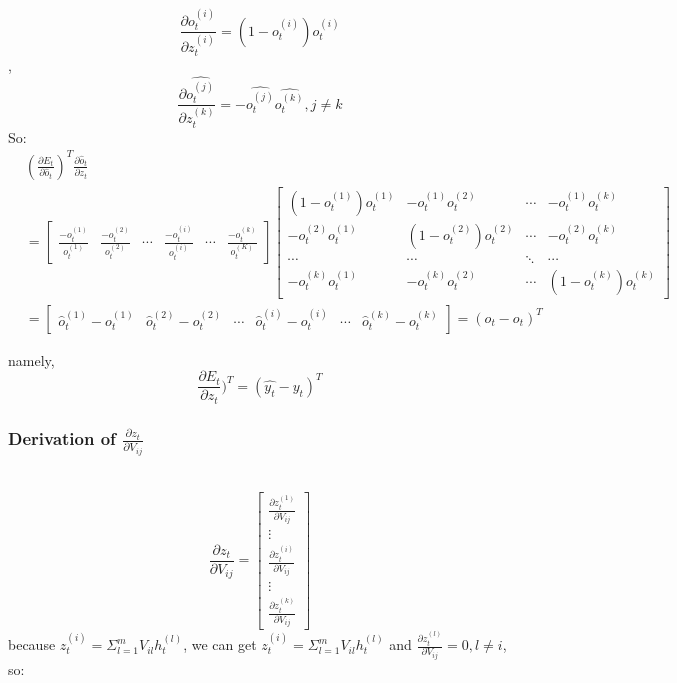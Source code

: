 \documentclass[oneside,solution]{seu-ml-assign}
\begin{document}
\begin{equation}\frac{\partial o_t^{(i)}}{\partial z_t^{(i)}}=(1-o_t^{(i)})o_t^{(i)}\end{equation},
\begin{equation}\frac{\partial\hat{o_t^{(j)}}}{\partial z_t^{(k)}}=-\hat{o_t^{(j)}}\hat{o_t^{(k)}},j\neq k\end{equation}
So:
\begin{equation}
  \begin{aligned}
     & \left(\frac{\partial E_{t}}{\partial \hat{o}_{t}}\right)^{T} \frac{\partial \hat{o}_{t}}{\partial z_{t}}                                      \\
     & = \begin{bmatrix}
           \frac{-o_t^{(1)}}{o_t^{(1)}} & \frac{-o_t^{(2)}}{o_t^{(2)}} & \cdots & \frac{-o_t^{(i)}}{o_t^{(i)}} & \cdots & \frac{-o_t^{(k)}}{o_t^{(K)}}
         \end{bmatrix}
    \begin{bmatrix}
      (1-o_t^{(1)})o_t^{(1)} & -o_t^{(1)}o_t^{(2)}    & \cdots & -o_t^{(1)}o_t^{(k)}    \\
      -o_t^{(2)}o_t^{(1)}    & (1-o_t^{(2)})o_t^{(2)} & \cdots & -o_t^{(2)}o_t^{(k)}    \\
      \cdots                 & \cdots                 & \ddots & \cdots                 \\
      -o_t^{(k)}o_t^{(1)}    & -o_t^{(k)}o_t^{(2)}    & \cdots & (1-o_t^{(k)})o_t^{(k)}
    \end{bmatrix}                                                                \\
     & = \begin{bmatrix}
           \hat{o}_t^{(1)} - o_t^{(1)} & \hat{o}_t^{(2)} - o_t^{(2)} & \cdots & \hat{o}_t^{(i)} - o_t^{(i)} & \cdots & \hat{o}_t^{(k)} - o_t^{(k)}
         \end{bmatrix} = (\hat{o}_t - o_t)^T
  \end{aligned}
\end{equation}


namely, \begin{equation}\frac{\partial E_{t}}{\partial z_{t}})^{T}=(\hat{y_{t}}-y_{t})^{T}\end{equation}


\subsubsection{Derivation of $\frac{\partial z_t}{\partial V_{ij}}$}
\
\[
  \frac{\partial z_t}{\partial V_{ij}} = \begin{bmatrix}
    \frac{\partial z_t^{(1)}}{\partial V_{ij}} \\
    \vdots                                     \\
    \frac{\partial z_t^{(i)}}{\partial V_{ij}} \\
    \vdots                                     \\
    \frac{\partial z_t^{(k)}}{\partial V_{ij}}
  \end{bmatrix}
\] because $z_t^{(i)}=\Sigma_{l=1}^mV_{il}h_t^{(l)}$, we can get $z_t^{(i)}=\Sigma_{l=1}^mV_{il}h_t^{(l)}$ and
$\frac{\partial z_t^{(l)}}{\partial V_{ij}}=0,l\neq i$, so:
\end{document}
